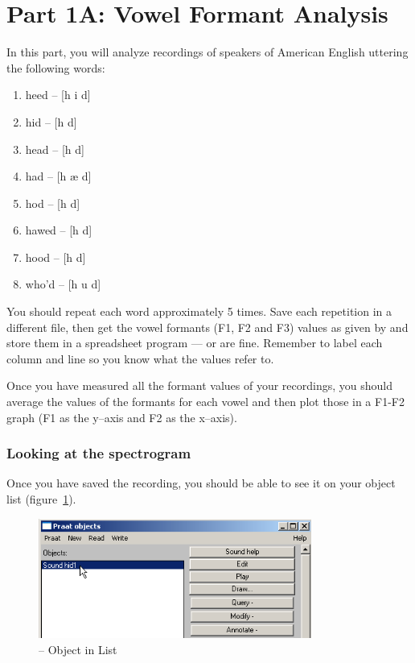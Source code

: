 \section{Part 1A: Vowel Formant Analysis}

In this part, you will analyze recordings of speakers of American English uttering the following words:

\begin{enumerate}
\item heed -- [h i\textlengthmark{} d]
\item hid -- [h \textsci{} d]
\item head -- [h \textepsilon{} d] 
\item had -- [h \ae {} d]
\item hod -- [h \textscripta\textlengthmark{} d]
\item hawed -- [h \textopeno\textlengthmark{} d]
\item hood -- [h \textupsilon{} d]
\item who'd -- [h u\textlengthmark{} d]
\end{enumerate}

You should repeat each word approximately 5 times. Save each repetition in a different file, then get the vowel formants (F1, F2 and F3) values as given by \Praat{} and store them in a spreadsheet program --- \MSExcel{} or \OpOff{} are fine. Remember to label each column and line so you know what the values refer to.

Once you have measured all the formant values of your recordings, you should average the values of the formants for each vowel and then plot those in a F1-F2 graph (F1 as the y--axis and F2 as the x--axis).


\subsubsection{Looking at the spectrogram}

Once you have saved the recording, you should be able to see it on your object list (figure~\ref{step1look}).

\begin{figure}[!tbp]
\caption{\Praat{} -- Object in List}
\label{step1look}
	\begin{center}
		\includegraphics[width=0.8\textwidth]{./figures/PraatObjectinList}
	\end{center}
\end{figure}



